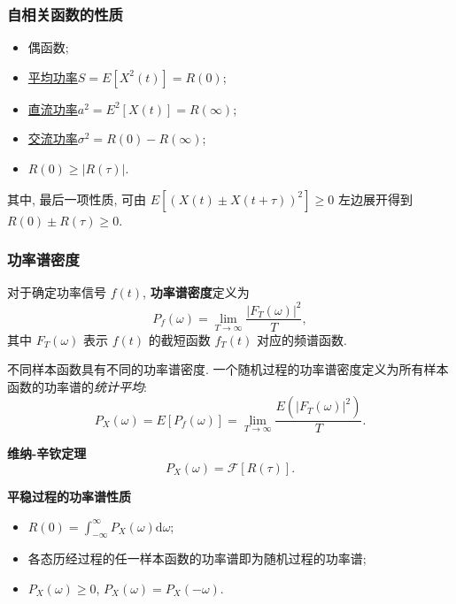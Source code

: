 \subsubsection{自相关函数的性质}
\begin{itemize}
    \item 偶函数;
    \item \underline{平均功率}\quad $S=E[X^2(t)]=R(0)$;
    \item \underline{直流功率}\quad $a^2=E^2[X(t)]=R(\infty)$;
    \item \underline{交流功率}\quad $\sigma^2=R(0)-R(\infty)$;
    \item $R(0)\geq|R(\tau)|$.
\end{itemize}

其中, 最后一项性质, 可由 $E[(X(t)\pm X(t+\tau))^2]\geq 0$ 左边展开得到 $R(0)\pm R(\tau)\geq 0$.

\subsubsection{功率谱密度}
对于确定功率信号 $f(t)$, \textbf{功率谱密度}定义为
\begin{equation}
    P_f(\omega)=\lim_{T\rightarrow\infty}\frac{|F_T(\omega)|^2}{T},
\end{equation}
其中 $F_T(\omega)$ 表示 $f(t)$ 的截短函数 $f_T(t)$ 对应的频谱函数.

不同样本函数具有不同的功率谱密度. 一个随机过程的功率谱密度定义为所有样本函数的功率谱的\textit{统计平均}:
\begin{equation}
    P_X(\omega)=E[P_f(\omega)]=\lim_{T\rightarrow\infty}\frac{E(|F_T(\omega)|^2)}{T}.
\end{equation}

\textbf{维纳-辛钦定理}
\begin{equation} \label{eq:3.2 wiener}
    P_X(\omega)=\mathcal{F}[R(\tau)].
\end{equation}

\textbf{平稳过程的功率谱性质}
\begin{itemize}
    \item $R(0)=\displaystyle\int_{-\infty}^{\infty}P_X(\omega)\mathrm{d}\omega$;
    \item 各态历经过程的任一样本函数的功率谱即为随机过程的功率谱;
    \item $P_X(\omega)\geq 0$, $P_X(\omega)=P_X(-\omega)$.
\end{itemize}
